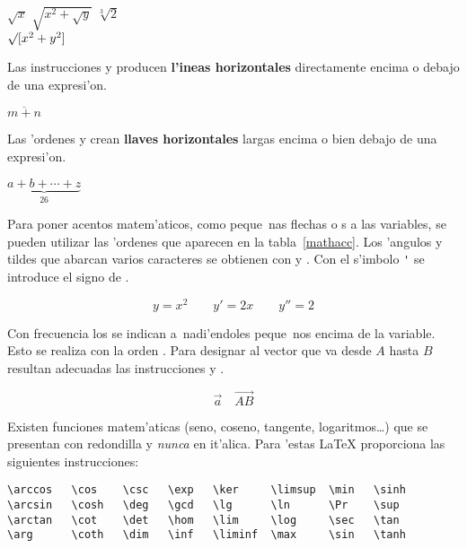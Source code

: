 \begin{example}
$\sqrt{x}$ \qquad 
$\sqrt{ x^{2}+\sqrt{y} }$ 
\qquad $\sqrt[3]{2}$\\[3pt]
$\surd[x^2 + y^2]$
\end{example}

Las instrucciones  y  producen
\textbf{l'ineas horizontales} directamente encima o debajo de una
expresi'on.
\begin{example}
$\overline{m+n}$
\end{example}

Las 'ordenes  y  crean \textbf{llaves
  horizontales} largas encima o bien debajo de una expresi'on.
\begin{example}
$\underbrace{ a+b+\cdots+z }_{26}$
\end{example}

Para poner acentos matem'aticos, como
peque~nas flechas o s a las variables, se pueden utilizar
las 'ordenes que aparecen en la tabla~\ref{mathacc}. Los 'angulos y
tildes que abarcan varios caracteres se obtienen con  y
. Con el s'imbolo \verb|'| se
introduce el signo de .

\begin{example}
\begin{displaymath}
y=x^{2}\qquad y'=2x\qquad y''=2
\end{displaymath}
\end{example}

Con frecuencia los \textbf{} se indican a~nadi'endoles
 peque~nos encima de la variable. Esto se
realiza con la orden . Para designar al vector que va desde
$A$ hasta $B$ resultan adecuadas las instrucciones 
y .

\begin{example}
\begin{displaymath}
\vec a\quad\overrightarrow{AB}
\end{displaymath}
\end{example}


Existen funciones matem'aticas (seno, coseno, tangente,
logaritmos\ldots) que se presentan con redondilla y \emph{nunca} en
it'alica. Para 'estas \LaTeX{} proporciona las siguientes
instrucciones: 

\begin{verbatim}
\arccos   \cos    \csc   \exp   \ker     \limsup  \min   \sinh
\arcsin   \cosh   \deg   \gcd   \lg      \ln      \Pr    \sup
\arctan   \cot    \det   \hom   \lim     \log     \sec   \tan
\arg      \coth   \dim   \inf   \liminf  \max     \sin   \tanh
\end{verbatim}

